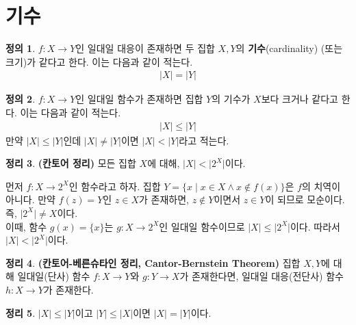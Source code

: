 \documentclass[b5paper, 11pt]{book}
\theoremstyle{definition}
\newtheorem{defn}{정의}[chapter]
\newtheorem{thm}[defn]{정리}
\newenvironment{pf*}{\pushQED{\qed}\pf}
{\popQED\endpf}
\begin{document}
\section{기수}
\begin{defn}
    $f: X \rightarrow Y$인 일대일 대응이 존재하면
    두 집합 $X, Y$의 \textbf{기수}(cardinality) (또는 크기)가 같다고 한다.
     이는 다음과 같이 적는다.
    \begin{align*}
        \vert X \vert = \vert Y \vert
    \end{align*}
\end{defn}
\begin{defn}
    $f: X \rightarrow Y$인 일대일 함수가
    존재하면 집합 $Y$의 기수가 $X$보다 크거나 같다고 한다. 이는 다음과 같이 적는다.
    \begin{align*}
        \vert X \vert \le \vert Y \vert
    \end{align*} 
    만약 $\vert X \vert \le \vert Y \vert$인데 $\vert X \vert \neq \vert Y \vert$이면
    $\vert X \vert < \vert Y \vert$라고 적는다.
\end{defn}
\begin{thm}
    \textbf{(칸토어 정리)} 모든 집합 $X$에 대해, $\vert X \vert < \vert 2^X \vert$이다.
\end{thm}
\begin{pf*}
    먼저 $f: X \rightarrow 2^X$인 함수라고 하자. 집합 $Y = \{x \;\vert\; x \in X \wedge
    x \notin f(x)\}$은 $f$의 치역이 아니다. 만약 $f(z) = Y$인 $z \in X$가 존재하면,
    $z \notin Y$이면서 $z \in Y$이 되므로 모순이다. 즉, $\vert 2^X \vert
    \neq X$이다. \\ 
    이때, 함수 $g(x) = \{x\}$는 $g: X \rightarrow 2^X$인 일대일 함수이므로
    $\vert X \vert \le \vert 2^X \vert$이다. 따라서 $\vert X \vert < \vert 2^X \vert$이다.
\end{pf*}
\begin{thm}
    \textbf{(칸토어-베른슈타인 정리, Cantor-Bernstein Theorem)} 집합 $X, Y$에 대해 일대일(단사) 함수 $f: X \rightarrow Y$와 $g: Y \rightarrow X$가 존재한다면, 일대일 대응(전단사) 함수 $h: X \rightarrow Y$가 존재한다.
\end{thm}
\begin{thm}
    $\vert X \vert \le \vert Y \vert$이고 $\vert Y \vert \le \vert X \vert$이면 $\vert X \vert = \vert Y \vert$이다.
\end{thm}
\end{document}
